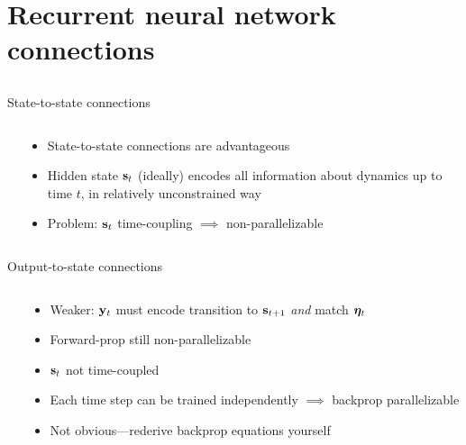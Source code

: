 \section{Recurrent neural network connections}
\subsection{}

\begin{frame}{State-to-state connections}
    \begin{columns}
        \begin{column}{0.71\textwidth}
            
            
        \end{column}
        \begin{column}{0.29\textwidth}
            \begin{itemize}
                \item State-to-state connections are advantageous
                \item Hidden state $\mathbf{s}_t$ (ideally) encodes all information about dynamics up to time $t$, in relatively unconstrained way
                \item Problem: $\mathbf{s}_t$ time-coupling $\implies$ non-parallelizable
            \end{itemize}
        \end{column}
    \end{columns}
\end{frame}

\begin{frame}{Output-to-state connections}
    \begin{columns}
        \begin{column}{0.71\textwidth}
            
            
        \end{column}
        \begin{column}{0.29\textwidth}
            \begin{itemize}
                \item Weaker: $\mathbf{y}_t$ must encode transition to $\mathbf{s}_{t+1}$ \emph{and} match $\bm{\eta}_t$
                \item Forward-prop still non-parallelizable
                \item $\mathbf{s}_t$ not time-coupled
                \item Each time step can be trained independently $\implies$ backprop parallelizable
                \item Not obvious---rederive backprop equations yourself \smiley
            \end{itemize}
        \end{column}
    \end{columns}
\end{frame}

